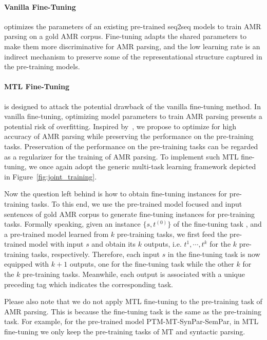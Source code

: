 \documentclass[11pt,a4paper]{article}
\begin{document}
\paragraph{Vanilla Fine-Tuning} optimizes the parameters of an existing pre-trained seq2seq models to train AMR parsing on a gold AMR corpus. Fine-tuning adapts the shared parameters to make them more discriminative for AMR parsing, and the low learning rate is an indirect mechanism to preserve some of the representational structure captured in the pre-training models. 

\paragraph{MTL Fine-Tuning} is designed to attack the potential drawback of the vanilla fine-tuning method. In vanilla fine-tuning, optimizing model parameters to train AMR parsing presents a potential risk of overfitting. Inspired by~\citet{li_hoiem_pami_2018}, we propose to optimize for high accuracy of AMR parsing while preserving the performance on the pre-training tasks. Preservation of the performance on the pre-training tasks can be regarded as a regularizer for the training of AMR parsing. To implement such MTL fine-tuning, we once again adopt the generic multi-task learning framework depicted in Figure~\ref{fig:joint_training}. 

Now the question left behind is how to obtain fine-tuning instances for pre-training tasks.  To this end, we use the pre-trained model focused and input sentences of gold AMR corpus to generate fine-tuning instances for pre-training tasks. Formally speaking, given an instance $\{s,t^{(0)}\}$ of the fine-tuning task , and a pre-trained model learned from $k$ pre-training tasks, we first feed the pre-trained model with input $s$ and obtain its $k$ outputs, i.e. $t^{1},\cdots,t^{k}$ for the $k$ pre-training tasks, respectively. Therefore, each input $s$ in the fine-tuning task is now equipped with $k+1$ outputs, one for the fine-tuning task while the other $k$ for the $k$ pre-training tasks. Meanwhile, each output is associated with a unique preceding tag which indicates the corresponding task.

Please also note that we do not apply MTL fine-tuning to the pre-training task of AMR parsing. This is because the fine-tuning task is the same as the pre-training task. For example, for the pre-trained model PTM-MT-SynPar-SemPar, in MTL fine-tuning we only keep the pre-training tasks of MT and syntactic parsing.
\end{document}

